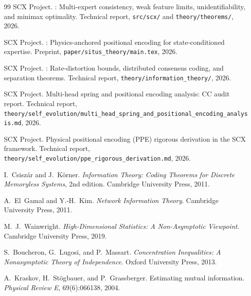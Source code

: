 \documentclass[11pt,a4paper]{article}
\theoremstyle{remark}
\begin{document}
\begin{thebibliography}{99}
SCX Project.
: Multi-expert consistency, weak feature limits,
  unidentifiability, and minimax optimality.
\newblock Technical report, \texttt{src/scx/} and \texttt{theory/theorems/}, 2026.

SCX Project.
: Physics-anchored positional encoding for state-conditioned expertise.
\newblock Preprint, \texttt{paper/situs\_theory/main.tex}, 2026.

SCX Project.
:
  Rate-distortion bounds, distributed consensus coding, and separation theorems.
\newblock Technical report, \texttt{theory/information\_theory/}, 2026.

SCX Project.
\newblock Multi-head spring and positional encoding analysis: {CC} audit report.
\newblock Technical report,
  \texttt{theory/self\_evolution/multi\_head\_spring\_and\_positional\_encoding\_analysis.md},
  2026.

SCX Project.
\newblock Physical positional encoding ({PPE}) rigorous derivation in the {SCX} framework.
\newblock Technical report,
  \texttt{theory/self\_evolution/ppe\_rigorous\_derivation.md}, 2026.

I.~Csisz\'{a}r and J.~K\"{o}rner.
\newblock \emph{Information Theory: Coding Theorems for Discrete Memoryless Systems},
  2nd edition.
\newblock Cambridge University Press, 2011.

A.~El~Gamal and Y.-H.~Kim.
\newblock \emph{Network Information Theory}.
\newblock Cambridge University Press, 2011.

M.~J.~Wainwright.
\newblock \emph{High-Dimensional Statistics: A Non-Asymptotic Viewpoint}.
\newblock Cambridge University Press, 2019.

S.~Boucheron, G.~Lugosi, and P.~Massart.
\newblock \emph{Concentration Inequalities: A Nonasymptotic Theory of Independence}.
\newblock Oxford University Press, 2013.

A.~Kraskov, H.~St\"{o}gbauer, and P.~Grassberger.
\newblock Estimating mutual information.
\newblock \emph{Physical Review E}, 69(6):066138, 2004.

\end{thebibliography}
\end{document}
